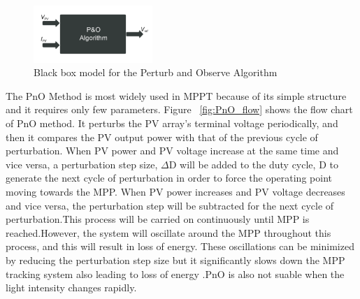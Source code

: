 {    \begin{figure}[H]
       \begin{center}
       \includegraphics[width=0.4\textwidth]{images/PnO_block}
       \caption{ Black box model for the Perturb and Observe Algorithm }
       \label{fig:PnO_block}
       \end{center}
       \end{figure}
       
  The \ac{PnO} Method is most widely used in \ac{MPPT} because of  its simple structure and it requires only few parameters. Figure ~\ref{fig:PnO_flow}  shows the flow chart of \ac{PnO} method. It perturbs the PV array's terminal voltage periodically, and then it compares the PV output power with that of the previous cycle of perturbation. When PV power and PV voltage increase at the same time and vice versa, a perturbation step size, ${\Delta}$D will be added to the duty cycle, D to generate the next cycle of   perturbation in order to force the operating point moving towards the \ac{MPP}. When PV power increases and PV voltage decreases and vice versa, the perturbation step will be subtracted for the next cycle of perturbation.This process will be carried on continuously until \ac{MPP} is reached.However, the system will oscillate around the \ac{MPP} throughout this process, and this will result in loss of energy. These oscillations can be minimized by reducing the perturbation step size but it significantly slows down the \ac{MPP} tracking system also leading to loss of energy \cite{ngan2011study}.\ac{PnO} is also not suable when the light intensity changes rapidly. \\
  
}
